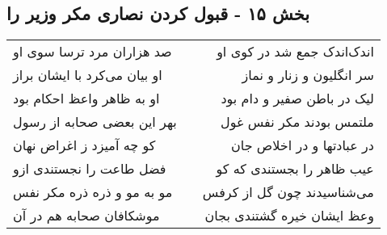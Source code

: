 \begin{center}
\section*{بخش ۱۵ - قبول کردن نصاری مکر وزیر را}
\label{sec:sh015}
\begin{longtable}{l p{0.5cm} r}
صد هزاران مرد ترسا سوی او
&&
اندک‌اندک جمع شد در کوی او
\\
او بیان می‌کرد با ایشان براز
&&
سر انگلیون و زنار و نماز
\\
او به ظاهر واعظ احکام بود
&&
لیک در باطن صفیر و دام بود
\\
بهر این بعضی صحابه از رسول
&&
ملتمس بودند مکر نفس غول
\\
کو چه آمیزد ز اغراض نهان
&&
در عبادتها و در اخلاص جان
\\
فضل طاعت را نجستندی ازو
&&
عیب ظاهر را بجستندی که کو
\\
مو به مو و ذره ذره مکر نفس
&&
می‌شناسیدند چون گل از کرفس
\\
موشکافان صحابه هم در آن
&&
وعظ ایشان خیره گشتندی بجان
\\
\end{longtable}
\end{center}
